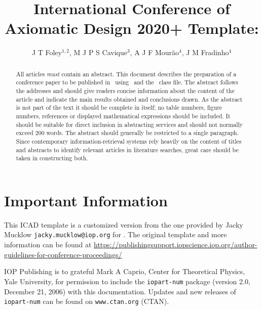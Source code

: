 \documentclass[a4paper]{jpconf}
\begin{document}
\title{International Conference of Axiomatic Design 2020+ Template: \jpcs}

\author{J T Foley$^{1,2}$, M J P S Cavique$^{3}$, A J F Mourão$^{4}$, J M Fradinho$^{4}$}

\address{$^{1}$Reykjavik University, Menntavegur 1, Reykjavik 102, Iceland}
\address{$^{2}$Massachusetts Institute of Technology, 77 Massachusetts Ave, Cambridge MA 02139, USA}
\address{$^{3}$Naval Academy (PT), Department of Sciences and Technology, Base Naval --- Alfeite, Almada, 2810-001, Portugal}
\address{$^{4}$Faculdade de Ci\^{e}ncias e Technologia, Universidade Nova De Lisboa, 2829-516 Caparica, Portugal}

\begin{abstract}
  All articles {\it must} contain an abstract.
This document describes the preparation of a conference paper to be published in \jpcs\ using \LaTeXe\ and the \cls\ class file.
The abstract follows the addresses and should give readers concise information about the content of the article and indicate the main results obtained and conclusions drawn.
As the abstract is not part of the text it should be complete in itself; no table numbers, figure numbers, references or displayed mathematical expressions should be included.
It should be suitable for direct inclusion in abstracting services and should not normally exceed 200 words.
The abstract should generally be restricted to a single paragraph.
Since contemporary information-retrieval systems rely heavily on the content of titles and abstracts to identify relevant articles in literature searches, great care should be taken in constructing both.
\end{abstract}

\section*{Important Information}
This ICAD template is a customized version from the one provided by Jacky Mucklow \texttt{jacky.mucklow@iop.org} for \jpcs.
The original template and more information can be found at \url{https://publishingsupport.iopscience.iop.org/author-guidelines-for-conference-proceedings/}

IOP Publishing is to grateful Mark A Caprio, Center for Theoretical Physics, Yale University, for permission to include the {\tt iopart-num} \BibTeX package (version 2.0, December 21, 2006) with  this documentation. Updates and new releases of {\tt iopart-num} can be found on \verb"www.ctan.org" (CTAN). 
\end{document}
